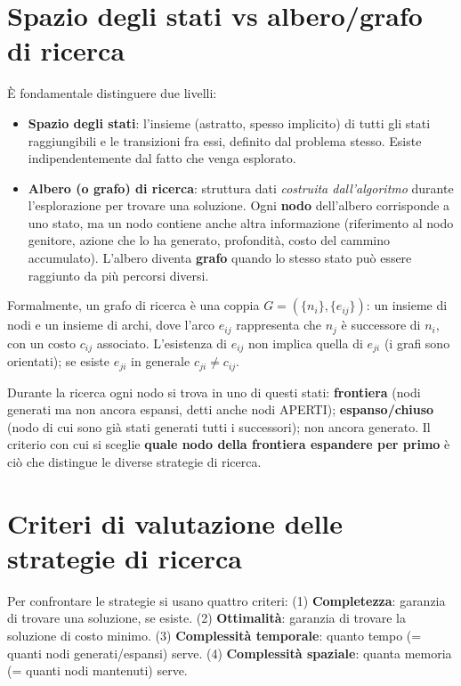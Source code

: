 \documentclass[11pt,a4paper]{report}
\begin{document}
\section{Spazio degli stati vs albero/grafo di ricerca}

È fondamentale distinguere due livelli:
\begin{itemize}
  \item \textbf{Spazio degli stati}: l'insieme (astratto, spesso implicito) di tutti gli stati raggiungibili e le transizioni fra essi, definito dal problema stesso. Esiste indipendentemente dal fatto che venga esplorato.
  \item \textbf{Albero (o grafo) di ricerca}: struttura dati \emph{costruita dall'algoritmo} durante l'esplorazione per trovare una soluzione. Ogni \textbf{nodo} dell'albero corrisponde a uno stato, ma un nodo contiene anche altra informazione (riferimento al nodo genitore, azione che lo ha generato, profondità, costo del cammino accumulato). L'albero diventa \textbf{grafo} quando lo stesso stato può essere raggiunto da più percorsi diversi.
\end{itemize}

Formalmente, un grafo di ricerca è una coppia $G = (\{n_i\}, \{e_{ij}\})$: un insieme di nodi e un insieme di archi, dove l'arco $e_{ij}$ rappresenta che $n_j$ è successore di $n_i$, con un costo $c_{ij}$ associato. L'esistenza di $e_{ij}$ non implica quella di $e_{ji}$ (i grafi sono orientati); se esiste $e_{ji}$ in generale $c_{ji} \neq c_{ij}$.

Durante la ricerca ogni nodo si trova in uno di questi stati: \textbf{frontiera} (nodi generati ma non ancora espansi, detti anche nodi APERTI); \textbf{espanso/chiuso} (nodo di cui sono già stati generati tutti i successori); non ancora generato. Il criterio con cui si sceglie \textbf{quale nodo della frontiera espandere per primo} è ciò che distingue le diverse strategie di ricerca.

\section{Criteri di valutazione delle strategie di ricerca}

Per confrontare le strategie si usano quattro criteri: (1) \textbf{Completezza}: garanzia di trovare una soluzione, se esiste. (2) \textbf{Ottimalità}: garanzia di trovare la soluzione di costo minimo. (3) \textbf{Complessità temporale}: quanto tempo (= quanti nodi generati/espansi) serve. (4) \textbf{Complessità spaziale}: quanta memoria (= quanti nodi mantenuti) serve.
\end{document}
